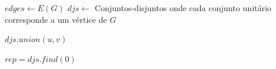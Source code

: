 \begin{algorithm}[!ht]
\begin{footnotesize}
\SetAlgoLined
{}
\Begin
{
    $edges \gets E(G)$\;
    $djs \gets $ Conjuntos-disjuntos onde cada conjunto unitário corresponde a um vértice de $G$\;
    
    {
        $djs.union(u, v)$\;
    }

    $rep = djs.find(0)$\;

    {
        {
            \;
        }
    }
    
    \;
}
\caption{\textsc{$is\_connected\_disjoint\_sets$}\label{alg:is_connected_disjoin_sets}}
\end{footnotesize}
\end{algorithm}